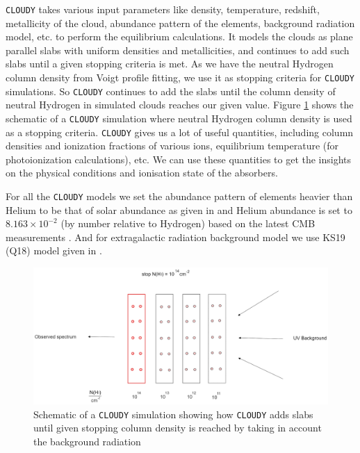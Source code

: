 {\tt CLOUDY} takes various input parameters like density, temperature, redshift, metallicity of the cloud, abundance pattern of the elements, background radiation model, etc. to perform the equilibrium calculations. It models the clouds as plane parallel slabs with uniform densities and metallicities, and continues to add such slabs until a given stopping criteria is met. As we have the neutral Hydrogen column density from Voigt profile fitting, we use it as stopping criteria for {\tt CLOUDY} simulations. So {\tt CLOUDY} continues to add the slabs until the column density of neutral Hydrogen in simulated clouds reaches our given value.
Figure \ref{fig:Cloudy} shows the schematic of a {\tt CLOUDY} simulation where neutral Hydrogen column density is used as a stopping criteria.
{\tt CLOUDY} gives us a lot of useful quantities, including column densities and ionization fractions of various ions, equilibrium temperature (for photoionization calculations), etc. We can use these quantities to get the insights on the physical conditions and ionisation state of the absorbers. 

For all the {\tt CLOUDY} models we set the abundance pattern of elements heavier than Helium to be that of solar abundance as given in \citet{grevesse-chemical-2010} and Helium abundance is set to $8.163\times{10}^{-2}$ (by number relative to Hydrogen) based on the latest CMB measurements \citep{planck_collaboration_planck_2020}. And for extragalactic radiation background model we use KS19 (Q18) model given in \cite{KS19}.  

\begin{figure}[!htbp]
    \centering
    \includegraphics[width=\textwidth]{Figures/Cloudy.png}
    \caption{Schematic of a {\tt CLOUDY} simulation showing how {\tt {CLOUDY}} adds slabs until given stopping column density is reached by taking in account the background radiation}
    \label{fig:Cloudy}
\end{figure}


